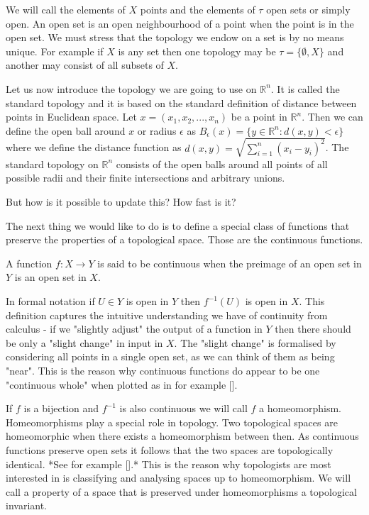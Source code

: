 We will call the elements of $X$ points and the elements of $\tau$ open sets or simply open. An open set is an open neighbourhood of a point when the point is in the open set. We must stress that the topology we endow on a set is by no means unique. For example if $X$ is any set then one topology may be $\tau = \{\emptyset, X\}$ and another may consist of all subsets of $X$. 

Let us now introduce the topology we are going to use on $\mathbb{R}^n$. It is called the standard topology and it is based on the standard definition of distance between points in Euclidean space. Let $x = (x_1, x_2, ..., x_n)$ be a point in $\mathbb{R}^n$. Then we can define the open ball around $x$ or radius $\epsilon$ as $B_\epsilon(x) = \{y \in \mathbb{R}^n: d(x, y) < \epsilon\}$ where we define the distance function as $d(x, y) = \sqrt{\sum_{i=1}^n{(x_i - y_i)^2}}$. The standard topology on $\mathbb{R}^n$ consists of the open balls around all points of all possible radii and their finite intersections and arbitrary unions.

But how is it possible to update this? How fast is it?

The next thing we would like to do is to define a special class of functions that preserve the properties of a topological space. Those are the continuous functions.

\begin{defn} A function $f : X \to Y$ is said to be continuous when the preimage of an open set in $Y$ is an open set in $X$. \end{defn}

In formal notation if $U \in Y$ is open in $Y$ then $f^{-1}(U)$ is open in $X$. This definition captures the intuitive understanding we have of continuity from calculus - if we "slightly adjust" the output of a function in $Y$ then there should be only a "slight change" in input in $X$. The "slight change" is formalised by considering all points in a single open set, as we can think of them as being "near". This is the reason why continuous functions do appear to be one "continuous whole" when plotted as in for example []. 
    

If $f$ is a bijection and $f^{-1}$ is also continuous we will call $f$ a homeomorphism. Homeomorphisms play a special role in topology. Two topological spaces are homeomorphic when there exists a homeomorphism between then. As continuous functions preserve open sets it follows that the two spaces are topologically identical. *See for example [].*  This is the reason why topologists are most interested in is classifying and analysing spaces up to homeomorphism. We will call a property of a space that is preserved under homeomorphisms a topological invariant.

